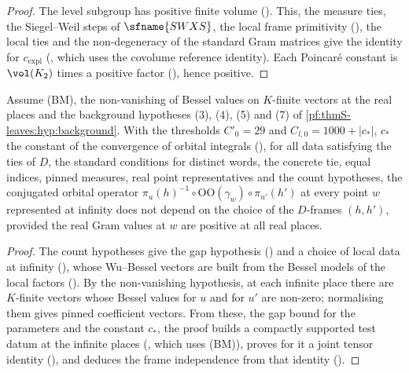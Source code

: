 \begin{proof}
The level subgroup has positive finite volume (). This, the measure ties,
the Siegel--Weil steps of $\sfname{SWXS}$, the local frame primitivity (), the local ties and the
non-degeneracy of the standard Gram matrices give the identity for $c_{\mathrm{expl}}$
(, which uses the covolume reference identity). Each Poincar\'e constant is
$\vol(K_2)$ times a positive factor (), hence positive.
\end{proof}

\begin{proposition}\label{pf:thmS-leaves:prop:vindep}
Assume \textup{(BM)}, the non-vanishing of Bessel values on $K$-finite vectors at the real places and the background hypotheses
(3), (4), (5) and (7) of \cref{pf:thmS-leaves:hyp:background}. With the thresholds $C'_0=29$ and
$C_{l,0}=1000+|c_*|$, $c_*$ the constant of the convergence of orbital integrals
(), for all data satisfying the ties of $D$, the standard conditions for
distinct words, the concrete tie, equal indices, pinned measures, real point representatives and the count hypotheses, the conjugated
orbital operator $\pi_u(h)^{-1}\circ\mathrm{OO}(\gamma_w)\circ\pi_{u'}(h')$ at every point $w$ represented at infinity does not depend on the
choice of the $D$-frames $(h,h')$, provided the real Gram values at $w$ are positive at all real places.
\end{proposition}

\begin{proof}
The count hypotheses give the gap hypothesis () and a choice of local
data at infinity (), whose Wu--Bessel vectors are built from the Bessel models of the local
factors (). By the non-vanishing hypothesis, at each infinite place there are $K$-finite
vectors whose Bessel values for $u$ and for $u'$ are non-zero; normalising them gives pinned coefficient vectors. From these, the
gap bound for the parameters and the constant $c_*$, the proof builds a compactly supported test datum at the infinite places
(, which uses \textup{(BM)}), proves for it a joint tensor identity
(), and deduces the frame independence from that identity
().
\end{proof}

